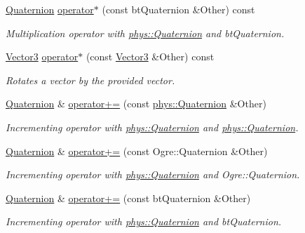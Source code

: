 \begin{DoxyCompactItemize}
\hyperlink{classphys_1_1Quaternion}{Quaternion} \hyperlink{classphys_1_1Quaternion_abafe5f21ebfac271310905b29da13373}{operator$\ast$} (const btQuaternion \&Other) const 
\begin{DoxyCompactList}\small\item\em Multiplication operator with \hyperlink{classphys_1_1Quaternion}{phys::Quaternion} and btQuaternion. \item\end{DoxyCompactList}\item 
\hyperlink{classphys_1_1Vector3}{Vector3} \hyperlink{classphys_1_1Quaternion_a4e3107c95f94d2b4ddae8c86be9fe28e}{operator$\ast$} (const \hyperlink{classphys_1_1Vector3}{Vector3} \&Other) const 
\begin{DoxyCompactList}\small\item\em Rotates a vector by the provided vector. \item\end{DoxyCompactList}\item 
\hyperlink{classphys_1_1Quaternion}{Quaternion} \& \hyperlink{classphys_1_1Quaternion_a5d9d2ee516e4e142417b21eecf2e94ce}{operator+=} (const \hyperlink{classphys_1_1Quaternion}{phys::Quaternion} \&Other)
\begin{DoxyCompactList}\small\item\em Incrementing operator with \hyperlink{classphys_1_1Quaternion}{phys::Quaternion} and \hyperlink{classphys_1_1Quaternion}{phys::Quaternion}. \item\end{DoxyCompactList}\item 
\hyperlink{classphys_1_1Quaternion}{Quaternion} \& \hyperlink{classphys_1_1Quaternion_ada6772fd05ec9c8d50b8a25ece3d1c5b}{operator+=} (const Ogre::Quaternion \&Other)
\begin{DoxyCompactList}\small\item\em Incrementing operator with \hyperlink{classphys_1_1Quaternion}{phys::Quaternion} and Ogre::Quaternion. \item\end{DoxyCompactList}\item 
\hyperlink{classphys_1_1Quaternion}{Quaternion} \& \hyperlink{classphys_1_1Quaternion_ab167530770fb0463c5473b5f533db9a8}{operator+=} (const btQuaternion \&Other)
\begin{DoxyCompactList}\small\item\em Incrementing operator with \hyperlink{classphys_1_1Quaternion}{phys::Quaternion} and btQuaternion. \item\end{DoxyCompactList}\item 

\end{DoxyCompactItemize}
